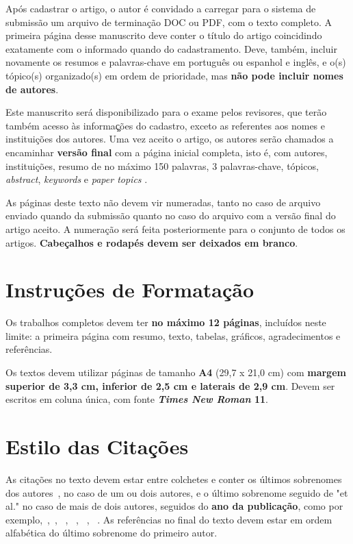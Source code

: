 \documentclass[a4paper,11pt]{article}
\begin{document}
    Ap\'os cadastrar o artigo, o autor \'e convidado a carregar para o sistema de submiss\~ao um arquivo 
    de termina\-\c c\~ao DOC ou PDF, com o texto completo. 
    A primeira p\'agina desse manuscrito deve conter o t\'itulo do artigo coincidindo exatamente com o informado quando do cadastramento. 
    Deve, tamb\'em, incluir novamente os resumos e palavras-chave em portugu\^es ou espanhol e ingl\^es, e o(s) t\'opico(s) organizado(s) 
    em ordem de prioridade, mas \textbf{n\~ao pode incluir nomes de autores}.

    Este manuscrito ser\'a disponibilizado para o exame pelos revisores, que ter\~ao tamb\'em acesso
     \`as informa\c ções do cadastro, exceto as referentes aos nomes e institui\c c\~oes dos autores. 
    Uma vez aceito o artigo, os autores ser\~ao chamados a encaminhar \textbf{vers\~ao final} com a p\'agina inicial completa, isto \'e, com autores, institui\c c\~oes, resumo de no m\'aximo 150 palavras, 3 palavras-chave, t\'opicos, \textit{abstract}, \textit{keywords} e \textit{paper topics} .

    As p\'aginas deste texto n\~ao devem vir numeradas, tanto no caso de arquivo enviado quando da submiss\~ao quanto no caso do arquivo com a vers\~ao final do artigo aceito. 
    A numera\c c\~ao ser\'a feita posteriormente para o conjunto de todos os artigos.
    \textbf{Cabe\c calhos e rodap\'es devem ser deixados em branco}.

  \section{ Instru\c c\~oes de Formata\c c\~ao}

    Os trabalhos completos devem ter \textbf{no m\'aximo 12 p\'aginas}, inclu\'idos neste limite: a primeira p\'agina com resumo, texto, tabelas, gr\'aficos, agradecimentos e refer\^encias.

    Os textos devem utilizar p\'aginas de tamanho \textbf{A4} (29,7 x 21,0 cm) com \textbf{margem superior de 3,3 cm, inferior de 2,5 cm e laterais de 2,9 cm}.
    Devem ser escritos em coluna \'unica, com fonte \textbf{\textit{Times New Roman} 11}. 

  \section{ Estilo das Cita\c c\~oes}

    As cita\c c\~oes no texto devem estar entre colchetes e conter  os \'ultimos sobrenomes dos autores~\citep{silva:99}, no caso de um ou dois autores, e o \'ultimo sobrenome seguido de "et al." no caso de mais de dois autores, seguidos do \textbf{ano da publica\c c\~ao}, como por exemplo,~\citep{anna:06},~\citep{gates:03}, ~\citep{smith:02}, ~\citep{silva:99}, ~\citep{pele:04}, ~\citep{web:16}.
    As refer\^encias no final do texto devem estar em ordem alfab\'etica do \'ultimo sobrenome do primeiro autor. 

  
  
\end{document}
